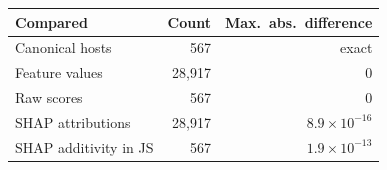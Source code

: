 \begin{tabular}{lrr}
\toprule
Compared & Count & Max.\ abs.\ difference \\
\midrule
Canonical hosts & 567 & exact \\
Feature values & 28{,}917 & $0$ \\
Raw scores & 567 & $0$ \\
SHAP attributions & 28{,}917 & $8.9\times 10^{-16}$ \\
SHAP additivity in JS & 567 & $1.9\times 10^{-13}$ \\
\bottomrule
\end{tabular}
